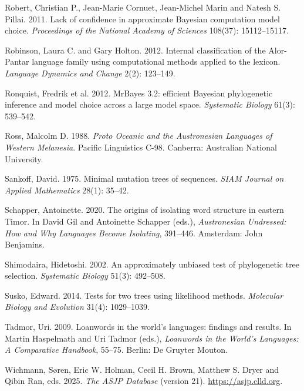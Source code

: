\documentclass[11pt]{article}
\begin{document}
\begin{thebibliography}{}
Robert, Christian P., Jean-Marie Cornuet, Jean-Michel Marin and Natesh S. Pillai. 2011. Lack of confidence in approximate Bayesian computation model choice. \emph{Proceedings of the National Academy of Sciences} 108(37): 15112--15117.

Robinson, Laura C. and Gary Holton. 2012. Internal classification of the Alor-Pantar language family using computational methods applied to the lexicon. \emph{Language Dynamics and Change} 2(2): 123--149.

Ronquist, Fredrik et al. 2012. MrBayes 3.2: efficient Bayesian phylogenetic inference and model choice across a large model space. \emph{Systematic Biology} 61(3): 539--542.

Ross, Malcolm D. 1988. \emph{Proto Oceanic and the Austronesian Languages of Western Melanesia}. Pacific Linguistics C-98. Canberra: Australian National University.

Sankoff, David. 1975. Minimal mutation trees of sequences. \emph{SIAM Journal on Applied Mathematics} 28(1): 35--42.

Schapper, Antoinette. 2020. The origins of isolating word structure in eastern Timor. In David Gil and Antoinette Schapper (eds.), \emph{Austronesian Undressed: How and Why Languages Become Isolating}, 391--446. Amsterdam: John Benjamins.

Shimodaira, Hidetoshi. 2002. An approximately unbiased test of phylogenetic tree selection. \emph{Systematic Biology} 51(3): 492--508.

Susko, Edward. 2014. Tests for two trees using likelihood methods. \emph{Molecular Biology and Evolution} 31(4): 1029--1039.

Tadmor, Uri. 2009. Loanwords in the world's languages: findings and results. In Martin Haspelmath and Uri Tadmor (eds.), \emph{Loanwords in the World's Languages: A Comparative Handbook}, 55--75. Berlin: De Gruyter Mouton.

Wichmann, Søren, Eric W. Holman, Cecil H. Brown, Matthew S. Dryer and Qibin Ran, eds. 2025. \emph{The ASJP Database} (version 21). \url{https://asjp.clld.org}.

\end{thebibliography}
\end{document}
